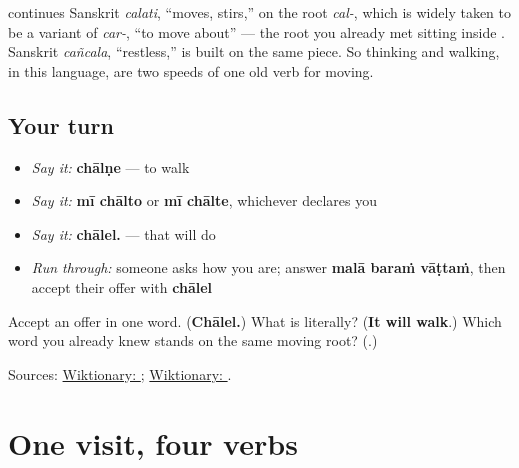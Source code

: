 \begin{cousinweb}
\textbf{} continues Sanskrit \textbf{} \emph{calati}, \textquotedblleft{}moves, stirs,\textquotedblright{} on the root \textbf{} \emph{cal-}, which is widely taken to be a variant of \textbf{} \emph{car-}, \textquotedblleft{}to move about\textquotedblright{} — the root you already met sitting inside \textbf{}. Sanskrit \textbf{} \emph{cañcala}, \textquotedblleft{}restless,\textquotedblright{} is built on the same piece. So thinking and walking, in this language, are two speeds of one old verb for moving.
\end{cousinweb}

\subsection*{Your turn}
\begin{itemize}
\raggedright
  \item \emph{Say it:} \textbf{chālṇe} — to walk
  \item \emph{Say it:} \textbf{mī chālto} or \textbf{mī chālte}, whichever declares you
  \item \emph{Say it:} \textbf{chālel.} — that will do
  \item \emph{Run through:} someone asks how you are; answer \textbf{malā baraṁ vāṭtaṁ}, then accept their offer with \textbf{chālel}
\end{itemize}

\begin{tcolorbox}[breakable,colback=teal!4,colframe=teal!35!black,title={Before you move on}]
Accept an offer in one word. (\textbf{Chālel.}) What is \textbf{} literally? (\textbf{It will walk}.) Which word you already knew stands on the same moving root? (\textbf{}.)

Sources: \href{https://en.wiktionary.org/wiki/\%E0\%A4\%9A\%E0\%A4\%BE\%E0\%A4\%B2\%E0\%A4\%A3\%E0\%A5\%87}{Wiktionary: }; \href{https://en.wiktionary.org/wiki/\%E0\%A4\%9A\%E0\%A4\%B2\%E0\%A4\%A4\%E0\%A4\%BF}{Wiktionary: }.
\end{tcolorbox}
\section[\texorpdfstring{\mr{बसा} / \mr{वाटतं} / \mr{झोप} … (basā / vāṭtaṁ …)}{बसा / वाटतं / झोप … (basā / vāṭtaṁ …)}]{One visit, four verbs}

\label{lesson:MR-R23-wellbeing-verbs}



